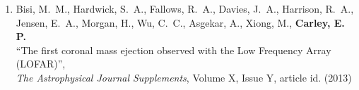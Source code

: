 \begin{enumerate}
\item Bisi, M.~M., Hardwick, S.~A., Fallows, R.~A., Davies, J.~A., Harrison, R.~A., Jensen, E.~A., Morgan, H.,
Wu, C.~C., Asgekar, A.,  Xiong, M.,  {\bf Carley, E. P.} \\
``The first coronal mass ejection observed with the Low Frequency Array (LOFAR)'', \\
\emph{The Astrophysical Journal Supplements}, Volume X, Issue Y, article id. (2013)

\end{enumerate}

